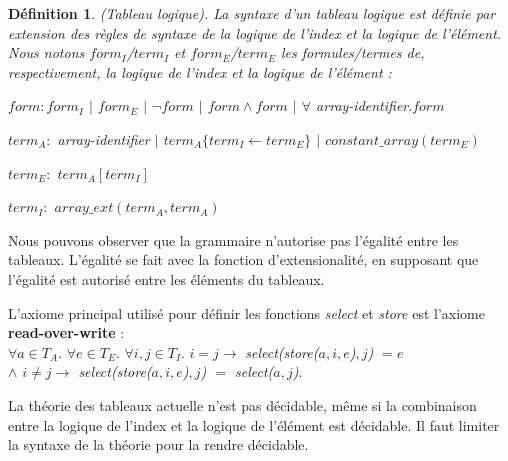 \documentclass[9pt]{book}
\newtheorem{definition}{D\'efinition}[section]
\begin{document}
	\begin{definition}
(Tableau logique). La syntaxe d'un tableau logique est d\'efinie par extension des r\`egles de syntaxe de la logique de l'index et la logique de l'\'el\'ement. Nous notons $form_{I}$/$term_{I}$ et $form_{E}$/$term_{E}$ les formules/termes de, respectivement, la logique de l'index et la logique de l'\'el\'ement :\par
$form : form_{I}$ $|$ $form_{E}$ $|$ $\neg form$ $|$ $form\land form$ $|$ $\forall$ array-identifier$. form$\par
$term_{A} :$ array-identifier $|$ $term_{A}\{term_{I}\leftarrow term_{E}\}$ $|$ $constant\_array(term_{E})$\par
$term_{E} :$ $term_{A}[term_{I}]$\par
$term_{I} :$ $array\_ext(term_{A},term_{A})$

\end{definition}
	Nous pouvons observer que la grammaire n'autorise pas l'\'egalit\'e entre les tableaux. L'\'egalit\'e se fait avec la fonction d'extensionalit\'e, en supposant que l'\'egalit\'e est autoris\'e entre les \'el\'ements du tableaux.\par
	L'axiome principal utilis\'e pour d\'efinir les fonctions \textit{select} et \textit{store} est l'axiome \textbf{read-over-write} :\\
	$\forall a\in T_{A}.$ $\forall e\in T_{E}.$ $\forall i,j\in T_{I}.$ $i=j \rightarrow$ \textit{select(store($a,i,e$)$,j$) $ = e$
			\\ $\land$ $i\neq j \rightarrow$ select(store($a,i,e$)$,j$) $=$ select($a,j$)}.\par
	La th\'eorie des tableaux actuelle n'est pas d\'ecidable, m\^eme si la combinaison entre la logique de l'index et la logique de l'\'el\'ement est d\'ecidable. Il faut limiter la syntaxe de la th\'eorie pour la rendre d\'ecidable.
\end{document}
